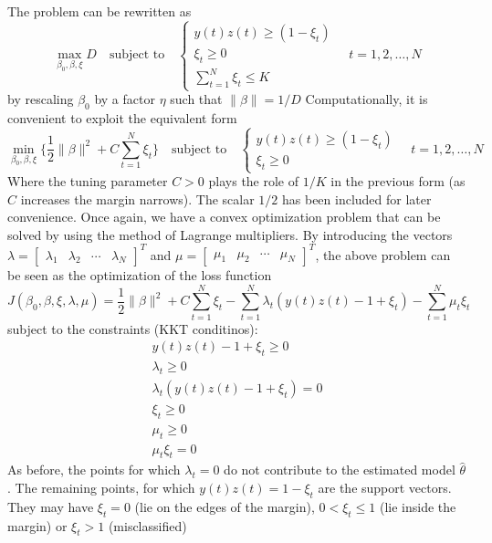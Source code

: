 \documentclass{book}
\begin{document}
The problem can be rewritten as 
\[
  \max_{\beta_0,\beta,\xi}D \quad \text{subject to} \quad \begin{cases}
    y(t)z(t)\geq (1-\xi_t)\\
    \xi_t \geq 0 \\
    \displaystyle\sum_{t=1}^{N}\xi_t \leq K
  \end{cases}\quad t=1,2,\dots,N
\]
by rescaling $\beta_0$ by a factor $\eta$ such that $\|\beta\|=1/D$ 
Computationally, it is convenient to exploit the equivalent form 
\[
  \min_{\beta_0,\beta,\xi}\{\displaystyle\frac{1}{2}\|\beta\|^2+C\displaystyle\sum_{t=1}^{N}\xi_t\} \quad \text{subject to}\quad \begin{cases}
    y(t)z(t) \geq (1-\xi_t)\\
    \xi_t \geq 0
  \end{cases} \quad t=1,2,\dots,N
\]
Where the tuning parameter $C>0$ plays the role of $1/K$ in the previous form (as $C$ increases the margin narrows). The scalar $1/2$ has been included for later convenience. Once again, we have a convex optimization problem that can be solved by using the method of Lagrange multipliers. By introducing the vectors $\lambda=\begin{bmatrix}
  \lambda_1 & \lambda_2 & \cdots & \lambda_N
\end{bmatrix}^T$ and $\mu=\begin{bmatrix}
  \mu_1 & \mu_2 & \cdots & \mu_N
\end{bmatrix}^T$, the above problem can be seen as the optimization of the loss function 
\[
  J(\beta_0,\beta,\xi,\lambda,\mu)=\displaystyle\frac{1}{2}\|\beta\|^2+C\displaystyle\sum_{t=1}^{N}\xi_t-\displaystyle\sum_{t=1}^{N}\lambda_t(y(t)z(t)-1+\xi_t)-\displaystyle\sum_{t=1}^{N}\mu_t\xi_t
\]
subject to the constraints (KKT conditinos): 
\begin{gather*}
  y(t)z(t)-1+\xi_t \geq 0\\
  \lambda_t \geq 0\\
  \lambda_t(y(t)z(t)-1+\xi_t)=0\\
  \xi_t \geq0\\
  \mu_t \geq 0 \\
  \mu_t\xi_t = 0
\end{gather*}
As before, the points for which $\lambda_t=0$ do not contribute to the estimated model $\hat{\theta}$. The remaining points, for which $y(t)z(t)=1-\xi_t$ are the support vectors. They may have $\xi_t=0$ (lie on the edges of the margin), $0<\xi_t\leq 1$ (lie inside the margin) or $\xi_t>1$ (misclassified)
\end{document}
